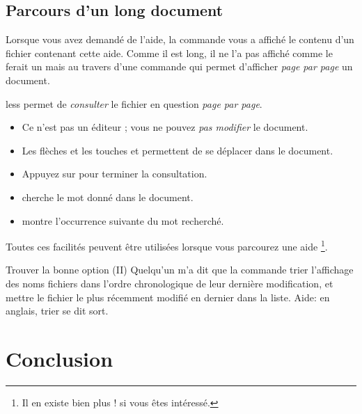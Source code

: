 \documentclass[a4paper,11pt]{style-esi/td}
\begin{document}
	\subsection{Parcours d'un long document}  

		Lorsque vous avez demandé de l'aide, 
		la commande  vous a affiché 
		le contenu d'un fichier contenant cette aide.
		Comme il est long, il ne l'a pas affiché comme le ferait un 
		mais au travers d'une commande 
		qui permet d'afficher \emph{page par page} un document.

		\begin{theorie}{less}
			permet de \emph{consulter} le fichier en question \emph{page par page}.
			\begin{itemize}
			\item
				Ce n'est pas un éditeur ; vous ne pouvez \emph{pas modifier} le document.
			\item 
				Les flèches et les touches  et 
				permettent de se déplacer dans le document.
			\item 
				Appuyez sur  pour terminer la consultation. 
			\item 
				 cherche le mot donné dans le document.
			\item 
				 montre l'occurrence suivante du mot recherché.
			\end{itemize}
		\end{theorie}

		Toutes ces facilités peuvent être utilisées lorsque vous parcourez
		une aide%
		\footnote{%
			Il en existe bien plus !  si vous êtes intéressé.
		}.

		\begin{Exercice}{Trouver la bonne option (II)}
			Quelqu'un m'a dit que la commande  
			trier l'affichage des noms fichiers
                        dans l'ordre chronologique de leur dernière modification,
                        et mettre le fichier le plus récemment modifié en dernier dans la liste.
			Aide: en anglais, trier se dit \og{}sort\fg{}.
		\end{Exercice}%

\section{Conclusion}
\end{document}
